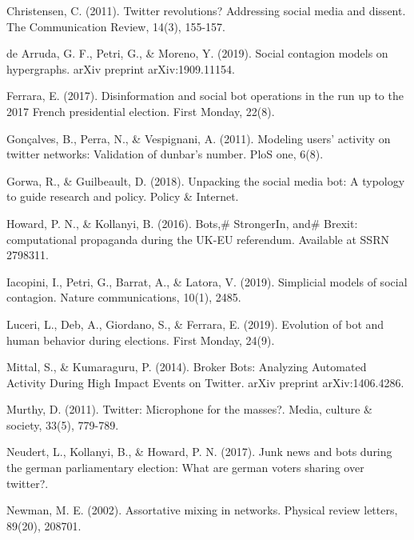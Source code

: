 \medskip

\begin{thebibliography}{1}

 Christensen, C. (2011). Twitter revolutions? Addressing social media and dissent. The Communication Review, 14(3), 155-157.

 de Arruda, G. F., Petri, G., \& Moreno, Y. (2019). Social contagion models on hypergraphs. arXiv preprint arXiv:1909.11154.

 Ferrara, E. (2017). Disinformation and social bot operations in the run up to the 2017 French presidential election. First Monday, 22(8).

 Gonçalves, B., Perra, N., \& Vespignani, A. (2011). Modeling users' activity on twitter networks: Validation of dunbar's number. PloS one, 6(8).

 Gorwa, R., \& Guilbeault, D. (2018). Unpacking the social media bot: A typology to guide research and policy. Policy \& Internet.

 Howard, P. N., \& Kollanyi, B. (2016). Bots,\# StrongerIn, and\# Brexit: computational propaganda during the UK-EU referendum. Available at SSRN 2798311.

 Iacopini, I., Petri, G., Barrat, A., \& Latora, V. (2019). Simplicial models of social contagion. Nature communications, 10(1), 2485.

 Luceri, L., Deb, A., Giordano, S., \& Ferrara, E. (2019). Evolution of bot and human behavior during elections. First Monday, 24(9).

 Mittal, S., \& Kumaraguru, P. (2014). Broker Bots: Analyzing Automated Activity During High Impact Events on Twitter. arXiv preprint arXiv:1406.4286.

 Murthy, D. (2011). Twitter: Microphone for the masses?. Media, culture \& society, 33(5), 779-789.

 Neudert, L., Kollanyi, B., \& Howard, P. N. (2017). Junk news and bots during the german parliamentary election: What are german voters sharing over twitter?.

 Newman, M. E. (2002). Assortative mixing in networks. Physical review letters, 89(20), 208701.


\end{thebibliography}
